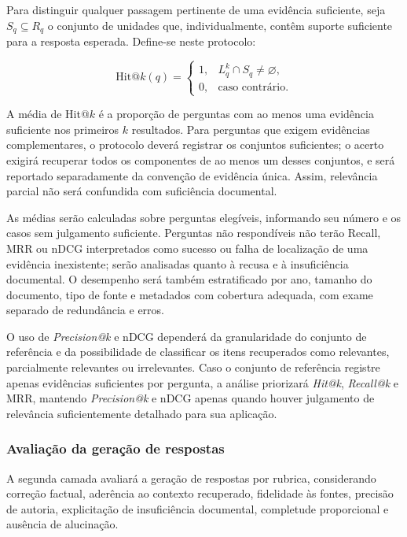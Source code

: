 Para distinguir qualquer passagem pertinente de uma evidência suficiente, seja $S_q\subseteq R_q$ o conjunto de unidades que, individualmente, contêm suporte suficiente para a resposta esperada. Define-se neste protocolo:

\begin{equation}
\mathrm{Hit@}k(q)=\begin{cases}1,&L_q^k\cap S_q\ne\varnothing,\\0,&\text{caso contrário}.\end{cases}
\label{eq:hit}
\end{equation}

A média de Hit@$k$ é a proporção de perguntas com ao menos uma evidência suficiente nos primeiros $k$ resultados. Para perguntas que exigem evidências complementares, o protocolo deverá registrar os conjuntos suficientes; o acerto exigirá recuperar todos os componentes de ao menos um desses conjuntos, e será reportado separadamente da convenção de evidência única. Assim, relevância parcial não será confundida com suficiência documental.

As médias serão calculadas sobre perguntas elegíveis, informando seu número e os casos sem julgamento suficiente. Perguntas não respondíveis não terão Recall, MRR ou nDCG interpretados como sucesso ou falha de localização de uma evidência inexistente; serão analisadas quanto à recusa e à insuficiência documental. O desempenho será também estratificado por ano, tamanho do documento, tipo de fonte e metadados com cobertura adequada, com exame separado de redundância e erros.

O uso de \textit{Precision@k} e nDCG dependerá da granularidade do conjunto de referência e da possibilidade de classificar os itens recuperados como relevantes, parcialmente relevantes ou irrelevantes. Caso o conjunto de referência registre apenas evidências suficientes por pergunta, a análise priorizará \textit{Hit@k}, \textit{Recall@k} e MRR, mantendo \textit{Precision@k} e nDCG apenas quando houver julgamento de relevância suficientemente detalhado para sua aplicação.

\subsubsection{Avaliação da geração de respostas}\label{sec:rubrica}

A segunda camada avaliará a geração de respostas por rubrica, considerando correção factual, aderência ao contexto recuperado, fidelidade às fontes, precisão de autoria, explicitação de insuficiência documental, completude proporcional e ausência de alucinação. 

